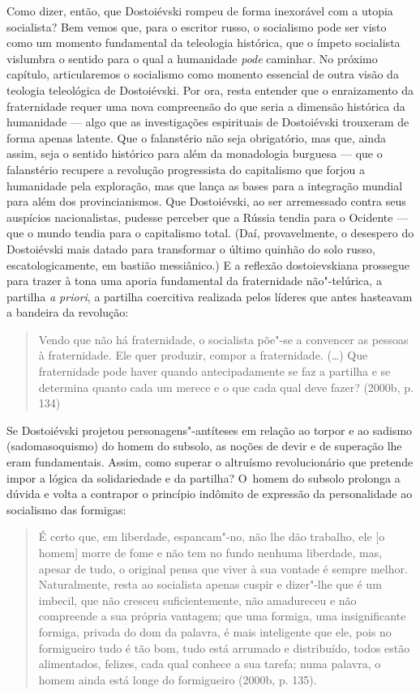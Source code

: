 Como dizer, então, que Dostoiévski rompeu de forma inexorável com a
utopia socialista? Bem vemos que, para o escritor russo, o socialismo
pode ser visto como um momento fundamental da teleologia histórica, que
o ímpeto socialista vislumbra o sentido para o qual a humanidade
\emph{pode} caminhar. No próximo capítulo, articularemos o socialismo
como momento essencial de outra visão da teologia teleológica de
Dostoiévski. Por ora, resta entender que o enraizamento da fraternidade
requer uma nova compreensão do que seria a dimensão histórica da
humanidade --- algo que as investigações espirituais de Dostoiévski
trouxeram de forma apenas latente. Que o falanstério não seja
obrigatório, mas que, ainda assim, seja o sentido histórico para além da
monadologia burguesa --- que o falanstério recupere a revolução
progressista do capitalismo que forjou a humanidade pela exploração, mas
que lança as bases para a integração mundial para além dos
provincianismos. Que Dostoiévski, ao ser arremessado contra seus
auspícios nacionalistas, pudesse perceber que a Rússia tendia para o
Ocidente --- que o mundo tendia para o capitalismo total. (Daí,
provavelmente, o desespero do Dostoiévski mais datado para transformar o
último quinhão do solo russo, escatologicamente, em bastião messiânico.)
E a reflexão dostoievskiana prossegue para trazer à tona uma aporia
fundamental da fraternidade não"-telúrica, a partilha \emph{a priori}, a
partilha coercitiva realizada pelos líderes que antes hasteavam a
bandeira da revolução:

\begin{quote}
Vendo que não há fraternidade, o socialista põe"-se a convencer as
pessoas à fraternidade. Ele quer produzir, compor a fraternidade. (\ldots)
Que fraternidade pode haver quando antecipadamente se faz a partilha e
se determina quanto cada um merece e o que cada qual deve fazer? (2000b,
p. 134)
\end{quote}

Se Dostoiévski projetou personagens"-antíteses em relação ao torpor e ao
sadismo (sadomasoquismo) do homem do subsolo, as noções de devir e de
superação lhe eram fundamentais. Assim, como superar o altruísmo
revolucionário que pretende impor a lógica da solidariedade e da
partilha? O~homem do subsolo prolonga a dúvida e volta a contrapor o
princípio indômito de expressão da personalidade ao socialismo das
formigas:

\begin{quote}
É certo que, em liberdade, espancam"-no, não lhe dão trabalho, ele {[}o
homem{]} morre de fome e não tem no fundo nenhuma liberdade, mas, apesar
de tudo, o original pensa que viver à sua vontade é sempre melhor.
Naturalmente, resta ao socialista apenas cuspir e dizer"-lhe que é um
imbecil, que não cresceu suficientemente, não amadureceu e não
compreende a sua própria vantagem; que uma formiga, uma insignificante
formiga, privada do dom da palavra, é mais inteligente que ele, pois no
formigueiro tudo é tão bom, tudo está arrumado e distribuído, todos
estão alimentados, felizes, cada qual conhece a sua tarefa; numa
palavra, o homem ainda está longe do formigueiro (2000b, p. 135).
\end{quote}

